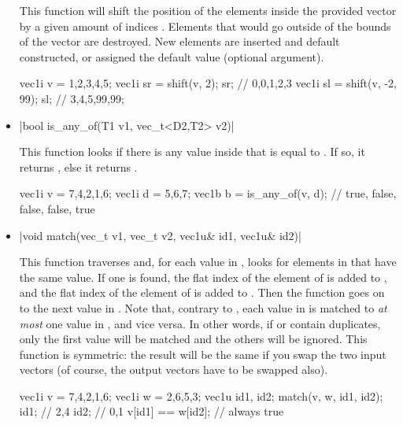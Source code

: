\documentclass[12pt]{report}
\newcommand*\circled[1]{\tikz[baseline=(char.base)]{
            \node[shape=circle,draw,inner sep=0.0pt] (char) {#1};}}
\newcommand{\vectorfuncsym}{\circled{$\hspace{-1pt}\mathcal{V}$}\xspace}
\newcommand{\vectorfunc}{\vectorfuncsym\hspace{2pt}\xspace}
\newenvironment{example}
{
    \begin{mdframed}[style=example,frametitle={Example}]
}
{
    \end{mdframed}
}
\begin{document}
\begin{itemize}
This function will shift the position of the elements inside the provided vector  by a given amount of indices . Elements that would go outside of the bounds of the vector are destroyed. New elements are inserted and default constructed, or assigned the default value  (optional argument).

\begin{example}
\begin{cppcode}
vec1i v = {1,2,3,4,5};
vec1i sr = shift(v, 2);
sr; // {0,0,1,2,3}
vec1i sl = shift(v, -2, 99);
sl; // {3,4,5,99,99};
\end{cppcode}
\end{example}

\item \vectorfunc \cppinline|bool is_any_of(T1 v1, vec_t<D2,T2> v2)| 

This function looks if there is any value inside  that is equal to . If so, it returns , else it returns .

\begin{example}
\begin{cppcode}
vec1i v = {7,4,2,1,6};
vec1i d = {5,6,7};
vec1b b = is_any_of(v, d); // {true, false, false, false, true}
\end{cppcode}
\end{example}

\item \cppinline|void match(vec_t v1, vec_t v2, vec1u& id1, vec1u& id2)| 

This function traverses  and, for each value in , looks for elements in  that have the same value. If one is found, the flat index of the element of  is added to , and the flat index of the element of  is added to . Then the function goes on to the next value in . Note that, contrary to , each value in  is matched to \emph{at most} one value in , and vice versa. In other words, if  or  contain duplicates, only the first value will be matched and the others will be ignored. This function is symmetric: the result will be the same if you swap the two input vectors (of course, the output vectors have to be swapped also).

\begin{example}
\begin{cppcode}
vec1i v = {7,4,2,1,6};
vec1i w = {2,6,5,3};
vec1u id1, id2;
match(v, w, id1, id2);
id1; // {2,4}
id2; // {0,1}
v[id1] == w[id2]; // always true
\end{cppcode}
\end{example}


\end{itemize}
\end{document}
